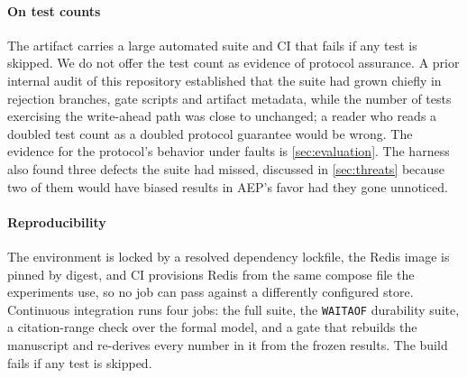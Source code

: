 \paragraph{On test counts} The artifact carries a large automated suite and CI
that fails if any test is skipped. We do not offer the test
count as evidence of protocol assurance. A prior internal audit of this
repository established that the suite had grown chiefly in rejection branches,
gate scripts and artifact metadata, while the number of tests exercising the
write-ahead path was close to unchanged; a reader who reads a doubled test
count as a doubled protocol guarantee would be wrong. The evidence for the
protocol's behavior under faults is \cref{sec:evaluation}. The harness also
found three defects the suite had missed, discussed in \cref{sec:threats}
because two of them would have biased results in AEP's favor had they gone
unnoticed.

\paragraph{Reproducibility} The environment is locked by a resolved dependency
lockfile, the
Redis image is pinned by digest, and CI provisions Redis from the same compose
file the experiments use, so no job can pass against a differently configured
store. Continuous integration runs four jobs: the full suite, the
\texttt{WAITAOF} durability suite, a citation-range check over the formal
model, and a gate that rebuilds the manuscript and re-derives every number in
it from the frozen results. The build fails if any test is skipped.
